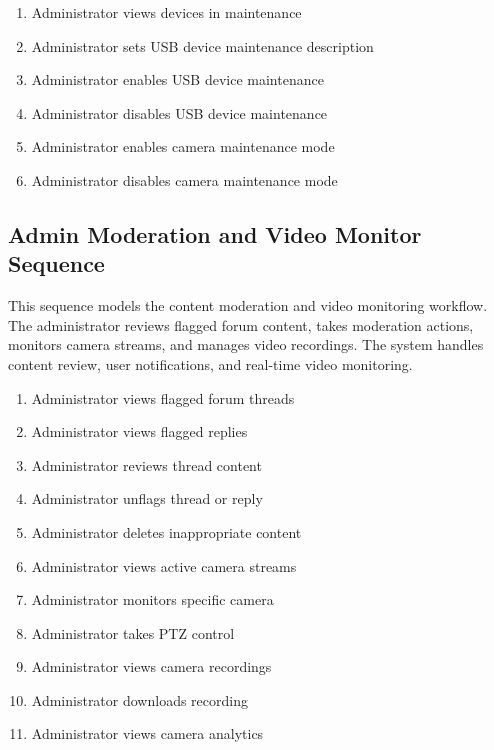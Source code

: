 \begin{enumerate}[topsep=0pt,itemsep=1pt,parsep=0pt,partopsep=0pt]
    \item Administrator views devices in maintenance
    \item Administrator sets USB device maintenance description
    \item Administrator enables USB device maintenance
    \item Administrator disables USB device maintenance
    \item Administrator enables camera maintenance mode
    \item Administrator disables camera maintenance mode
\end{enumerate}


\subsection{Admin Moderation and Video Monitor Sequence}
This sequence models the content moderation and video monitoring workflow. The
administrator reviews flagged forum content, takes moderation actions, monitors
camera streams, and manages video recordings. The system handles content
review, user notifications, and real-time video monitoring.

\begin{enumerate}[topsep=0pt,itemsep=1pt,parsep=0pt,partopsep=0pt]
    \item Administrator views flagged forum threads
    \item Administrator views flagged replies
    \item Administrator reviews thread content
    \item Administrator unflags thread or reply
    \item Administrator deletes inappropriate content
    \item Administrator views active camera streams
    \item Administrator monitors specific camera
    \item Administrator takes PTZ control
    \item Administrator views camera recordings
    \item Administrator downloads recording
    \item Administrator views camera analytics
\end{enumerate}

